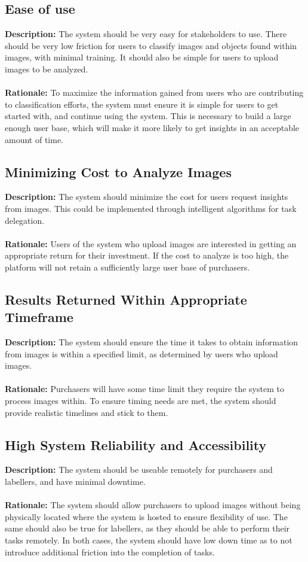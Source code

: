\documentclass{article}
\begin{document}
\subsection{Ease of use}
\textbf{Description: }The system should be very easy for stakeholders to use. There should be very low friction for users to classify images and objects found
within images, with minimal training. It should also be simple for users to upload images to be analyzed.\\\\
\textbf{Rationale: }To maximize the information gained from users who are contributing to classification efforts, the system must ensure it is simple for users to 
get started with, and continue using the system. This is necessary to build a large enough user base, which will make it more likely to get insights in an acceptable 
amount of time.
\subsection{Minimizing Cost to Analyze Images}
\textbf{Description: }The system should minimize the cost for users request insights from images. This could be implemented through intelligent algorithms for task delegation. \\\\
\textbf{Rationale: }Users of the system who upload images are interested in getting an appropriate return for their investment. If the cost to analyze is too high, the platform will not
retain a sufficiently large user base of purchasers.
\subsection{Results Returned Within Appropriate Timeframe}
\textbf{Description: }The system should ensure the time it takes to obtain information from images is within a specified limit, as determined by users who upload images. \\\\
\textbf{Rationale: }Purchasers will have some time limit they require the system to process images within. To ensure timing needs are met, the system should provide realistic timelines and stick to them.
\subsection{High System Reliability and Accessibility}
\textbf{Description: }The system should be useable remotely for purchasers and labellers, and have minimal downtime. \\\\
\textbf{Rationale: }The system should allow purchasers to upload images without being physically located where the system is hosted to ensure flexibility of use. The same should also be true for labellers, as they 
should be able to perform their tasks remotely. In both cases, the system should have low down time as to not introduce additional friction into the completion of tasks.
\end{document}
